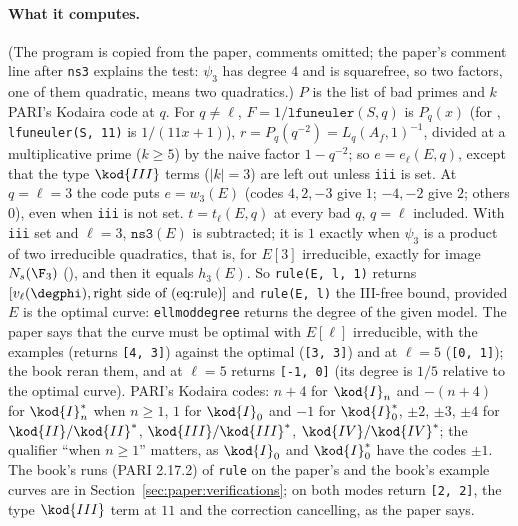\begin{sloppypar}
\paragraph{What it computes.} (The program is copied from the paper, comments omitted; the paper's comment line after \texttt{ns3} explains the test: $\psi_3$ has degree $4$ and is squarefree, so
two factors, one of them quadratic, means two quadratics.) $P$ is the list of bad primes and $k$ PARI's Kodaira code at $q$. For $q\ne\ell$, $F=1/\texttt{lfuneuler}(S,q)$
is $P_q(x)$ (for , \texttt{lfuneuler(S, 11)} is $1/(11x+1)$), $r=P_q(q^{-2})=L_q(A_f,1)^{-1}$, divided at a multiplicative prime ($k\ge5$) by the naive factor $1-q^{-2}$; so $e=e_\ell(E,q)$,
except that the type $\kod{III}$ terms ($|k|=3$) are left out unless \texttt{iii} is set. At $q=\ell=3$ the code puts $e=w_3(E)$ (codes $4,2,-3$ give $1$; $-4,-2$ give $2$; others $0$), even when
\texttt{iii} is not set. $t=t_\ell(E,q)$ at every bad $q$, $q=\ell$ included. With \texttt{iii} set and $\ell=3$, $\texttt{ns3}(E)$ is subtracted; it is $1$ exactly when $\psi_3$ is a product of two
irreducible quadratics, that is, for $E[3]$ irreducible, exactly for image $N_s(\F_3)$ (), and then it equals $h_3(E)$. So \texttt{rule(E, l, 1)} returns $[v_\ell(\degphi),\text{right side
of (eq:rule)}]$ and \texttt{rule(E, l)} the III-free bound, provided $E$ is the optimal curve: \texttt{ellmoddegree} returns the degree of the given model. The paper says that the curve must be
optimal with $E[\ell]$ irreducible, with the examples  (returns \texttt{[4, 3]}) against the optimal  (\texttt{[3, 3]}) and  at $\ell=5$ (\texttt{[0, 1]}); the book
reran them, and  at $\ell=5$ returns \texttt{[-1, 0]} (its degree is $1/5$ relative to the optimal curve). PARI's Kodaira codes: $n+4$ for $\kod{I}_n$ and $-(n+4)$ for $\kod{I}_n^*$ when $n\ge1$,
$1$ for $\kod{I}_0$ and $-1$ for $\kod{I}_0^*$, $\pm2$, $\pm3$, $\pm4$ for $\kod{II}/\kod{II}^*$, $\kod{III}/\kod{III}^*$, $\kod{IV}/\kod{IV}^*$; the qualifier ``when $n\ge1$'' matters, as $\kod{I}_0$ and $\kod{I}_0^*$ have the codes $\pm1$. The book's runs (PARI
2.17.2) of \texttt{rule} on the paper's and the book's example curves are in Section~\ref{sec:paper:verifications}; on  both modes return \texttt{[2, 2]}, the type $\kod{III}$ term at $11$ and the
correction cancelling, as the paper says.


\end{sloppypar}
